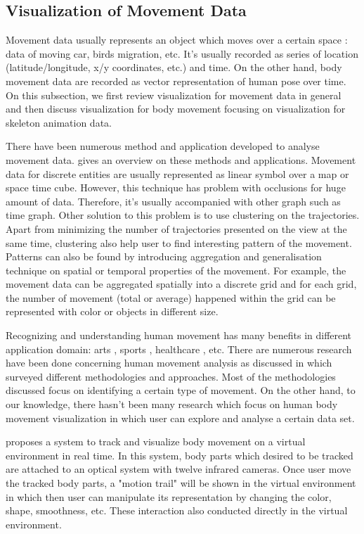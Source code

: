 \documentclass{vgtc}                          %
\begin{document}
\subsection{Visualization of Movement Data}

Movement data usually represents an object which moves over a certain space \cite{adrienko_book}: data of moving car, birds migration, etc. It's usually recorded as series of location (latitude/longitude, x/y coordinates, etc.) and time. On the other hand, body movement data are recorded as vector representation of human pose \cite{bernard2013} over time. On this subsection, we first review visualization for movement data in general and then discuss visualization for body movement focusing on visualization for skeleton animation data.

There have been numerous method and application developed to analyse movement data. \cite{adrienko} gives an overview on these methods and applications. Movement data for discrete entities are usually represented as linear symbol over a map or space time cube. However, this technique has problem with occlusions for huge amount of data. Therefore, it's usually accompanied with other graph such as time graph. Other solution to this problem is to use clustering on the trajectories. Apart from minimizing the number of trajectories presented on the view at the same time, clustering also help user to find interesting pattern of the movement. Patterns can also be found by introducing aggregation and generalisation technique on spatial or temporal properties of the movement. For example, the movement data can be aggregated spatially into a discrete grid and for each grid, the number of movement (total or average) happened within the grid can be represented with color or objects in different size. 

Recognizing and understanding human movement has many benefits in different application domain: arts \cite{heryadi,raptis}, sports \cite{bernard2013}, healthcare \cite{patsadu}, etc. There are numerous research have been done concerning human movement analysis as discussed in  \cite{gavrila} which surveyed different methodologies and approaches. Most of the methodologies discussed focus on identifying a certain type of movement. On the other hand, to our knowledge, there hasn't been many research which focus on human body movement visualization in which user can explore and analyse a certain data set. 

\cite{chmelik} proposes a system to track and visualize body movement on a virtual environment in real time. In this system, body parts  which desired to be tracked are attached to an optical system with twelve infrared cameras. Once user move the tracked body parts, a "motion trail" will be shown in the virtual environment in which then user can manipulate its representation by changing the color, shape, smoothness, etc. These interaction also conducted directly in the virtual environment. 
\end{document}
